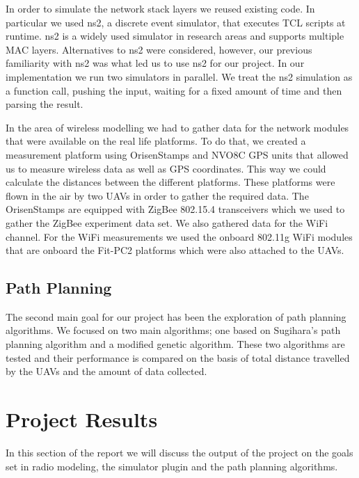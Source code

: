 In order to simulate the network stack layers we reused existing code. In
particular we used ns2, a discrete event simulator, that executes TCL scripts at
runtime. ns2 is a widely used simulator in research areas and supports multiple
MAC layers. Alternatives to ns2 were considered, however, our previous
familiarity with ns2 was what led us to use ns2 for our project. In our
implementation we run two simulators in parallel. We treat the ns2 simulation
as a function call, pushing the input, waiting for a fixed amount of time and
then parsing the result.

In the area of wireless modelling we had to gather data for the network modules
that were available on the real life platforms. To do that, we created a
measurement platform using OrisenStamps and NVO8C GPS units that allowed us to
measure wireless data as well as GPS coordinates. This way we could calculate
the distances between the different platforms. These platforms were flown in the
air by two UAVs in order to gather the required data. The OrisenStamps are
equipped with ZigBee 802.15.4 transceivers which we used to gather the ZigBee
experiment data set. We also gathered data for the WiFi channel. For the WiFi
measurements we used the onboard 802.11g WiFi modules that are onboard the
Fit-PC2 platforms which were also attached to the UAVs.

\subsection{Path Planning}
The second main goal for our project has been the exploration of path planning
algorithms. We focused on two main algorithms; one based on Sugihara's path
planning algorithm and a modified genetic algorithm. These two algorithms are
tested and their performance is compared on the basis of total distance
travelled by the UAVs and the amount of data collected.

\section{Project Results}
In this section of the report we will discuss the output of the project on the
goals set in radio modeling, the simulator plugin and the path planning
algorithms.

